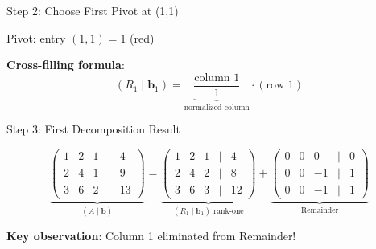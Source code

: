\documentclass[10pt]{beamer}
\theoremstyle{definition}
\newcommand{\x}[1]{\alert{\textbf{#1}}}
\begin{document}
\begin{frame}[fragile]{Step 2: Choose First Pivot at (1,1)}

\begin{center}
\end{center}

\vspace{0.5em}

Pivot: entry $(1,1) = 1$ (red)

\vspace{0.5em}

\x{Cross-filling formula}:
$$(R_1 \mid \mathbf{b}_1) = \underbrace{\frac{\text{column 1}}{1}}_{\text{normalized column}} \cdot (\text{row 1})$$

\end{frame}

\begin{frame}[fragile]{Step 3: First Decomposition Result}

$$\underbrace{\begin{pmatrix}
1 & 2 & 1 & | & 4 \\
2 & 4 & 1 & | & 9 \\
3 & 6 & 2 & | & 13
\end{pmatrix}}_{(A \mid \mathbf{b})} = \underbrace{\begin{pmatrix}
1 & 2 & 1 & | & 4 \\
2 & 4 & 2 & | & 8 \\
3 & 6 & 3 & | & 12
\end{pmatrix}}_{(R_1 \mid \mathbf{b}_1) \text{ rank-one}} + \underbrace{\begin{pmatrix}
0 & 0 & 0 & | & 0 \\
0 & 0 & -1 & | & 1 \\
0 & 0 & -1 & | & 1
\end{pmatrix}}_{\text{Remainder}}$$

\vspace{1em}

\x{Key observation}: Column 1 eliminated from Remainder!

\end{frame}
\end{document}
